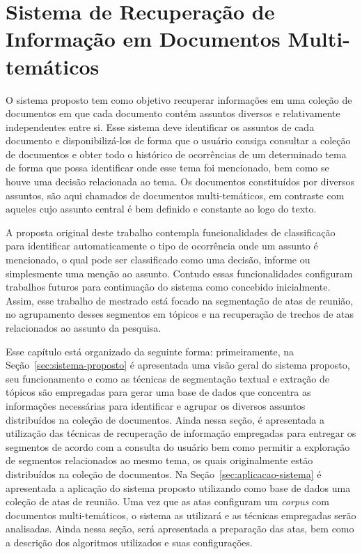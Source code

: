 \chapter{Sistema de Recuperação de Informação em Documentos Multi-temáticos}
\label{cap3}


O sistema proposto tem como objetivo recuperar informações em uma coleção de documentos em que cada documento contém assuntos diversos e relativamente independentes entre si. Esse sistema deve identificar os assuntos de cada documento e disponibilizá-los de forma que o usuário consiga consultar a coleção de documentos e obter todo o histórico de ocorrências de um determinado tema de forma que possa identificar onde esse tema foi mencionado, bem como se houve uma decisão relacionada ao tema. Os documentos constituídos por diversos assuntos, são aqui chamados de documentos multi-temáticos, em contraste com aqueles cujo assunto central é bem definido e constante ao logo do texto.  

A proposta original deste trabalho contempla funcionalidades de classificação para identificar automaticamente o tipo de ocorrência onde um assunto é mencionado, o qual pode ser classificado como uma decisão, informe ou simplesmente uma menção ao assunto. Contudo essas funcionalidades configuram trabalhos futuros para continuação do sistema como concebido inicialmente. Assim, esse trabalho de mestrado está focado na segmentação de atas de reunião, no agrupamento desses segmentos em tópicos e na recuperação de trechos de atas relacionados ao assunto da pesquisa.

Esse capítulo está organizado da seguinte forma: primeiramente, na Seção~\ref{sec:sistema-proposto} é apresentada uma visão geral do sistema proposto, seu funcionamento e como as técnicas de segmentação textual e extração de tópicos são empregadas para gerar uma base de dados que concentra as informações necessárias para identificar e agrupar os diversos assuntos distribuídos na coleção de documentos. Ainda nessa seção, é apresentada a utilização das técnicas de recuperação de informação empregadas para entregar os segmentos de acordo com a consulta do usuário bem como permitir a exploração de segmentos relacionados ao mesmo tema, os quais originalmente estão distribuídos na coleção de documentos.  
Na Seção~\ref{sec:aplicacao-sistema} é apresentada a aplicação do sistema proposto utilizando como base de dados uma coleção de atas de reunião. Uma vez que as atas configuram um \textit{corpus} com documentos multi-temáticos, o sistema as utilizará e as técnicas empregadas serão analisadas. Ainda nessa seção, será apresentada a preparação das atas, bem como a descrição dos algoritmos utilizados e suas configurações.






